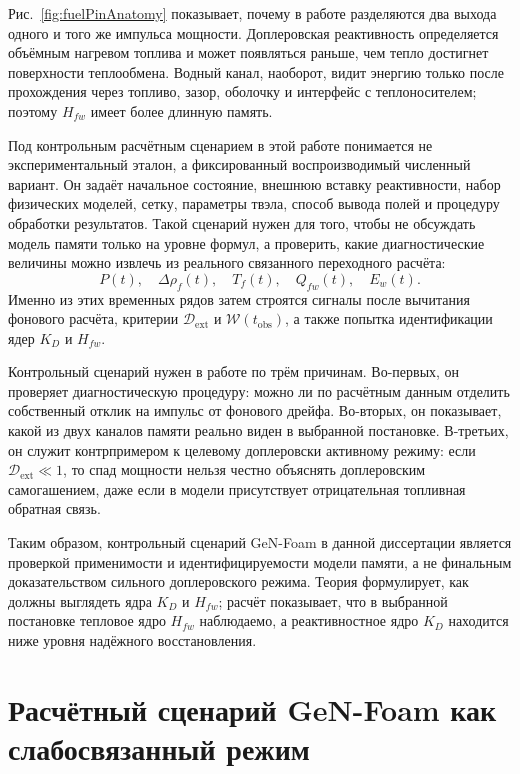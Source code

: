 \documentclass[12pt]{article}
\begin{document}
Рис.~\ref{fig:fuelPinAnatomy} показывает, почему в работе разделяются два выхода одного и того же импульса мощности. Доплеровская реактивность определяется объёмным нагревом топлива и может появляться раньше, чем тепло достигнет поверхности теплообмена. Водный канал, наоборот, видит энергию только после прохождения через топливо, зазор, оболочку и интерфейс с теплоносителем; поэтому \(H_{fw}\) имеет более длинную память.

Под контрольным расчётным сценарием в этой работе понимается не экспериментальный эталон, а фиксированный воспроизводимый численный вариант. Он задаёт начальное состояние, внешнюю вставку реактивности, набор физических моделей, сетку, параметры твэла, способ вывода полей и процедуру обработки результатов. Такой сценарий нужен для того, чтобы не обсуждать модель памяти только на уровне формул, а проверить, какие диагностические величины можно извлечь из реального связанного переходного расчёта:
\[
P(t),\quad
\Delta\rho_f(t),\quad
T_f(t),\quad
Q_{fw}(t),\quad
E_w(t).
\]
Именно из этих временных рядов затем строятся сигналы после вычитания фонового расчёта, критерии \(\mathcal D_{\mathrm{ext}}\) и \(\mathcal W(t_{\mathrm{obs}})\), а также попытка идентификации ядер \(K_D\) и \(H_{fw}\).

Контрольный сценарий нужен в работе по трём причинам. Во-первых, он проверяет диагностическую процедуру: можно ли по расчётным данным отделить собственный отклик на импульс от фонового дрейфа. Во-вторых, он показывает, какой из двух каналов памяти реально виден в выбранной постановке. В-третьих, он служит контрпримером к целевому доплеровски активному режиму: если \(\mathcal D_{\mathrm{ext}}\ll1\), то спад мощности нельзя честно объяснять доплеровским самогашением, даже если в модели присутствует отрицательная топливная обратная связь.

Таким образом, контрольный сценарий GeN-Foam в данной диссертации является проверкой применимости и идентифицируемости модели памяти, а не финальным доказательством сильного доплеровского режима. Теория формулирует, как должны выглядеть ядра \(K_D\) и \(H_{fw}\); расчёт показывает, что в выбранной постановке тепловое ядро \(H_{fw}\) наблюдаемо, а реактивностное ядро \(K_D\) находится ниже уровня надёжного восстановления.

\section{Расчётный сценарий GeN-Foam как слабосвязанный режим}
\end{document}
